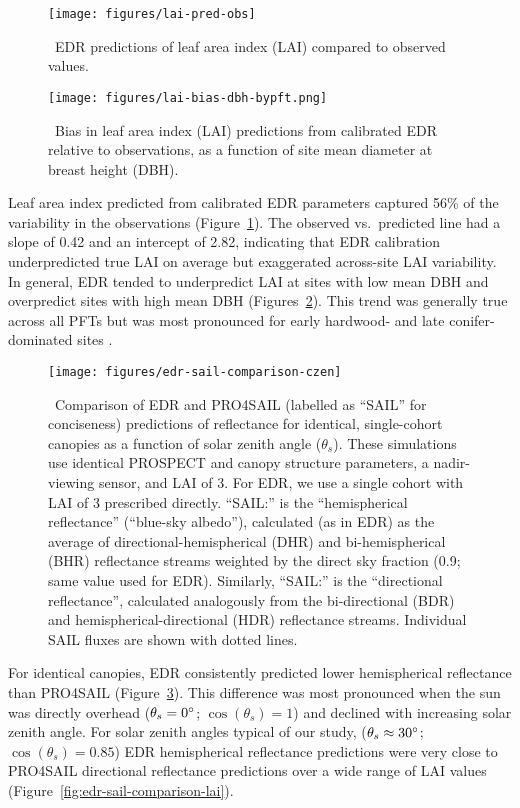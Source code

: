 \begin{figure}
  \centering
  \texttt{[image: figures/lai-pred-obs]}
  \caption{\
    EDR predictions of leaf area index (LAI) compared to observed values.
  }\label{fig:lai-pred-obs}
\end{figure}

\begin{figure}
  \centering
  \texttt{[image: figures/lai-bias-dbh-bypft.png]}
  \caption{\
    Bias in leaf area index (LAI) predictions from calibrated EDR relative to observations,
    as a function of site mean diameter at breast height (DBH).
  }\label{fig:lai-bias-dbh-bypft}
\end{figure}

Leaf area index predicted from calibrated EDR parameters captured 56\% of the variability in the observations (Figure~\ref{fig:lai-pred-obs}).
The observed vs.\ predicted line had a slope of 0.42 and an intercept of 2.82, indicating that EDR calibration underpredicted true LAI on average but exaggerated across-site LAI variability.
In general, EDR tended to underpredict LAI at sites with low mean DBH and overpredict sites with high mean DBH (Figures~\ref{fig:lai-bias-dbh-bypft}).
This trend was generally true across all PFTs but was most pronounced for early hardwood- and late conifer-dominated sites .

\begin{figure}
  \centering
  \texttt{[image: figures/edr-sail-comparison-czen]}
  \caption{\label{fig:edr-sail-comparison-czen}\
    Comparison of EDR and PRO4SAIL (labelled as ``SAIL'' for conciseness) predictions of reflectance for identical, single-cohort canopies as a function of solar zenith angle ($\theta_{s}$).
    These simulations use identical PROSPECT and canopy structure parameters, a nadir-viewing sensor, and LAI of 3.
    For EDR, we use a single cohort with LAI of 3 prescribed directly.\@
    ``SAIL:\@HR'' is the ``hemispherical reflectance'' (``blue-sky albedo''), calculated (as in EDR) as the average of directional-hemispherical (DHR) and bi-hemispherical (BHR) reflectance streams weighted by the direct sky fraction (0.9; same value used for EDR).
    Similarly, ``SAIL:\@DR'' is the ``directional reflectance'', calculated analogously from the bi-directional (BDR) and hemispherical-directional (HDR) reflectance streams.
    Individual SAIL fluxes are shown with dotted lines.
  }
\end{figure}

For identical canopies, EDR consistently predicted lower hemispherical reflectance than PRO4SAIL (Figure~\ref{fig:edr-sail-comparison-czen}).
This difference was most pronounced when the sun was directly overhead ($\theta_{s} = 0^{\circ}$; $\cos(\theta_{s}) = 1$) and declined with increasing solar zenith angle.
For solar zenith angles typical of our study, ($\theta_{s} \approx 30^{\circ}$; $\cos(\theta_{s}) = 0.85$) EDR hemispherical reflectance predictions were very close to PRO4SAIL directional reflectance predictions over a wide range of LAI values (Figure~\ref{fig:edr-sail-comparison-lai}).
